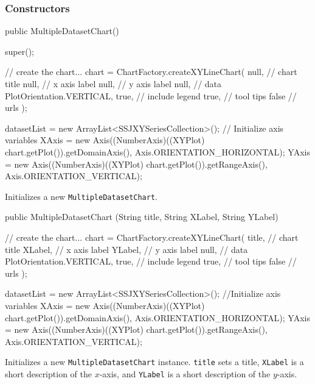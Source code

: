 \subsubsection*{Constructors}

\begin{code}
   public MultipleDatasetChart() \begin{hide} {
      super();

      // create the chart...
      chart = ChartFactory.createXYLineChart(
         null,                     // chart title
         null,                     // x axis label
         null,                     // y axis label
         null, // data
         PlotOrientation.VERTICAL,
         true,                     // include legend
         true,                     // tool tips
         false                     // urls
      );

      datasetList = new ArrayList<SSJXYSeriesCollection>();
      // Initialize axis variables
      XAxis = new Axis((NumberAxis)((XYPlot) chart.getPlot()).getDomainAxis(),
                 Axis.ORIENTATION_HORIZONTAL);
      YAxis = new Axis((NumberAxis)((XYPlot) chart.getPlot()).getRangeAxis(),
                 Axis.ORIENTATION_VERTICAL);
   }\end{hide}
\end{code}
\begin{tabb}
   Initializes a new \texttt{MultipleDatasetChart}.
\end{tabb}
\begin{code}

   public MultipleDatasetChart (String title, String XLabel, String YLabel) \begin{hide} {
      // create the chart...
      chart = ChartFactory.createXYLineChart(
         title,                    // chart title
         XLabel,                   // x axis label
         YLabel,                   // y axis label
         null,                     // data
         PlotOrientation.VERTICAL,
         true,                     // include legend
         true,                     // tool tips
         false                     // urls
      );

      datasetList = new ArrayList<SSJXYSeriesCollection>();
      //Initialize axis variables
      XAxis = new Axis((NumberAxis)((XYPlot) chart.getPlot()).getDomainAxis(),
              Axis.ORIENTATION_HORIZONTAL);
      YAxis = new Axis((NumberAxis)((XYPlot) chart.getPlot()).getRangeAxis(),
              Axis.ORIENTATION_VERTICAL);
   }\end{hide}
\end{code}
\begin{tabb}
   Initializes a new \texttt{MultipleDatasetChart} instance.
   \texttt{title} sets a title, \texttt{XLabel} is a short description of
   the $x$-axis, and \texttt{YLabel} is a short description of the $y$-axis.
\end{tabb}
\begin{htmlonly}
\end{htmlonly}

